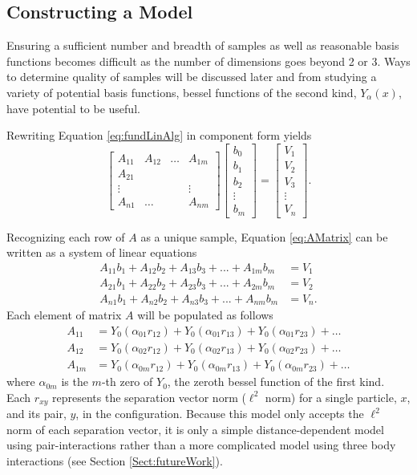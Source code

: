 \subsection{Constructing a Model}\label{Sect:LJModels}
\par Ensuring a sufficient number and breadth of samples as well as reasonable basis functions becomes difficult as the number of dimensions goes beyond 2 or 3. Ways to determine quality of samples will be discussed later and from studying a variety of potential basis functions, bessel functions of the second kind, $Y_\alpha(x)$, have potential to be useful.
\par Rewriting Equation \ref{eq:fundLinAlg} in component form yields
\begin{equation}
\begin{bmatrix}
A_{11} & A_{12} & \ldots & A_{1m} \\
A_{21} \\
\vdots & & & \vdots\\
A_{n1} & \ldots & & A_{nm}
\end{bmatrix}
\begin{bmatrix}
b_0 \\
b_1 \\
b_2 \\
\vdots \\
b_m 
\end{bmatrix}
=
\begin{bmatrix}
V_1 \\
V_2 \\
V_3 \\ 
\vdots \\
V_n
\end{bmatrix}.
\label{eq:AMatrix}
\end{equation}
\par Recognizing each row of $A$ as a unique sample, Equation \ref{eq:AMatrix} can be written as a system of linear equations
\begin{align}
A_{11}b_1 + A_{12}b_2 + A_{13}b_3 + ... + A_{1m}b_m &= V_1 \\
A_{21}b_1 + A_{22}b_2 + A_{23}b_3 + ... + A_{2m}b_m &= V_2 \\
A_{n1}b_1 + A_{n2}b_2 + A_{n3}b_3 + ... + A_{nm}b_m &= V_n.
\end{align}
Each element of matrix $A$ will be populated as follows
\begin{align}
A_{11} &= Y_0(\alpha_{01} r_{12}) + Y_0(\alpha_{01} r_{13}) + Y_0(\alpha_{01} r_{23}) + \ldots \\
A_{12} &= Y_0(\alpha_{02} r_{12}) + Y_0(\alpha_{02} r_{13}) + Y_0(\alpha_{02} r_{23}) + \ldots  \\
A_{1m} &= Y_0(\alpha_{0m} r_{12}) + Y_0(\alpha_{0m} r_{13}) + Y_0(\alpha_{0m} r_{23}) + \ldots
\end{align}
where $\alpha_{0m}$ is the $m$-th zero of $Y_0$, the zeroth bessel function of the first kind. Each $r_{xy}$ represents the separation vector norm ($\ell^2$ norm) for a single particle, $x$, and its pair, $y$, in the configuration. Because this model only accepts the $\ell^2$ norm of each separation vector, it is only a simple distance-dependent model using pair-interactions rather than a more complicated model using three body interactions (see Section \ref{Sect:futureWork}).

